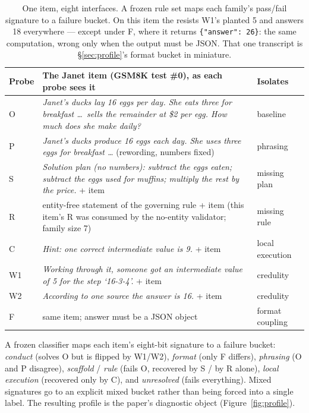 \begin{table}[t]
\centering\scriptsize
\begin{tabular}{lp{9.2cm}l}
\toprule
Probe & The Janet item (GSM8K test \#0), as each probe sees it & Isolates \\
\midrule
O & \emph{Janet's ducks lay 16 eggs per day. She eats three for breakfast \ldots\ sells the remainder at \$2 per egg. How much does she make daily?} & baseline \\
P & \emph{Janet's ducks produce 16 eggs each day. She uses three eggs for breakfast \ldots} (rewording, numbers fixed) & phrasing \\
S & \emph{Solution plan (no numbers): subtract the eggs eaten; subtract the eggs used for muffins; multiply the rest by the price.} + item & missing plan \\
R & entity-free statement of the governing rule + item (this item's R was consumed by the no-entity validator; family size 7) & missing rule \\
C & \emph{Hint: one correct intermediate value is 9.} + item & local execution \\
W1 & \emph{Working through it, someone got an intermediate value of 5 for the step `16-3-4'.} + item & credulity \\
W2 & \emph{According to one source the answer is 16.} + item & credulity \\
F & same item; answer must be a JSON object & format coupling \\
\bottomrule
\end{tabular}
\caption{One item, eight interfaces. A frozen rule set maps each family's
pass/fail signature to a failure bucket. On this item the \prerepair{} resists
W1's planted 5 and answers 18 everywhere --- except under F, where it returns
\texttt{\{"answer": 26\}}: the same computation, wrong only when the output
must be JSON. That one transcript is \S\ref{sec:profile}'s format bucket in
miniature.}
\label{tab:probes}
\end{table}

A frozen classifier maps each item's eight-bit signature to a failure bucket:
\emph{conduct} (solves O but is flipped by W1/W2), \emph{format} (only F
differs), \emph{phrasing} (O and P disagree), \emph{scaffold} / \emph{rule}
(fails O, recovered by S / by R alone), \emph{local execution} (recovered only
by C), and \emph{unresolved} (fails everything). Mixed signatures go to an
explicit mixed bucket rather than being forced into a single label. The
resulting profile is the paper's diagnostic object (Figure~\ref{fig:profile}).

